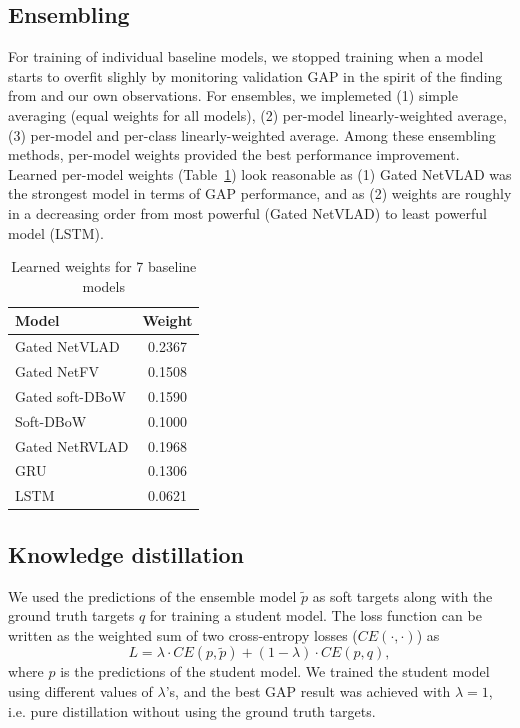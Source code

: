 \documentclass[runningheads]{llncs}
\begin{document}
\subsection{Ensembling} \label{sub:ensemble}
For training of individual baseline models, we stopped training when a model starts to overfit slighly by monitoring validation GAP in the spirit of the finding from \cite{bober2017} and our own observations.
For ensembles, we implemeted (1) simple averaging (equal weights for all models), (2) per-model linearly-weighted average, (3) per-model and per-class linearly-weighted average.
Among these ensembling methods, per-model weights provided the best performance improvement.
Learned per-model weights (Table~\ref{tab:learned_weights}) look reasonable as (1) Gated NetVLAD was the strongest model in terms of GAP performance, and as (2) weights are roughly in a decreasing order from most powerful (Gated NetVLAD) to least powerful model (LSTM).

\begin{table}[h!]
  \begin{center}
    \caption{Learned weights for 7 baseline models}
    \label{tab:learned_weights}

    \begin{tabular}{ l | c }
     Model & Weight \\
    \hline
    \hline
            Gated NetVLAD & 0.2367 \\
    \hline
            Gated NetFV & 0.1508 \\
    \hline
            Gated soft-DBoW & 0.1590 \\
    \hline
            Soft-DBoW & 0.1000 \\
    \hline
            Gated NetRVLAD & 0.1968\\
    \hline
            GRU & 0.1306 \\
    \hline
            LSTM & 0.0621
    \end{tabular}
  \end{center}
\end{table}

\subsection{Knowledge distillation} \label{sub:distillation}
We used the predictions of the ensemble model $\tilde{p}$ as soft targets along with the ground truth targets $q$ for training a student model.
The loss function can be written as the weighted sum of two cross-entropy losses ($CE(\cdot,\cdot)$) as
\begin{equation}
L = \lambda \cdot CE(p, \tilde{p}) + (1-\lambda) \cdot CE(p,  q),
\end{equation}
where $p$ is the predictions of the student model.
We trained the student model using different values of $\lambda$’s, and the best GAP result was achieved with $\lambda = 1$, i.e. pure distillation without using the ground truth targets.
\end{document}
